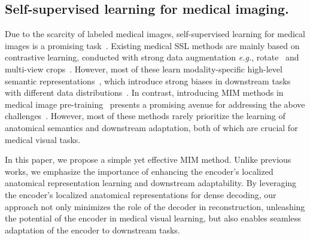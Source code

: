 \subsection{Self-supervised learning for medical imaging.}
Due to the scarcity of labeled medical images, self-supervised learning for medical images is a promising task~\citep{survey}. Existing medical SSL methods are mainly based on contrastive learning, conducted with strong data augmentation \textit{e.g.}, rotate~\citep{swinunetr, rotate} and multi-view crops~\citep{prlv2, unimiss, voco, gvsl, vox2vec}. However, most of these learn modality-specific high-level semantic representations~\citep{highlevel}, which introduce strong biases in downstream tasks with different data distributions~\citep{sslmia, bias}. In contrast, introducing MIM methods in medical image pre-training~\citep{mim, mae3d, hyspark} presents a promising avenue for addressing the above challenges~\citep{survey, mim}. However, most of these methods rarely prioritize the learning of anatomical semantics and downstream adaptation, both of which are crucial for medical visual tasks.

In this paper, we propose a simple yet effective MIM method. Unlike previous works, we emphasize the importance of enhancing the encoder's localized anatomical representation learning and downstream adaptability. By leveraging the encoder’s localized anatomical representations for dense decoding, our approach not only minimizes the role of the decoder in reconstruction, unleashing the potential of the encoder in medical visual learning, but also enables seamless adaptation of the encoder to downstream tasks.